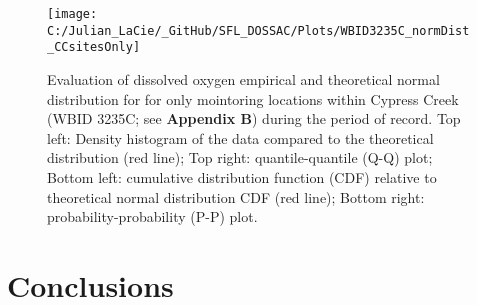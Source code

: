 \documentclass[]{interact}
\theoremstyle{plain}%
\theoremstyle{definition}
\theoremstyle{remark}
\begin{document}
\begin{figure}[H]

{\centering \texttt{[image: C:/Julian\_LaCie/\_GitHub/SFL\_DOSSAC/Plots/WBID3235C\_normDist\_CCsitesOnly]} 

}

\caption{\label{fig:fig13} Evaluation of dissolved oxygen empirical and theoretical normal distribution for for only mointoring locations within Cypress Creek (WBID 3235C; see \textbf{Appendix B}) during the period of record. Top left: Density histogram of the data compared to the theoretical distribution (red line); Top right: quantile-quantile (Q-Q) plot; Bottom left: cumulative distribution function (CDF) relative to theoretical normal distribution CDF (red line); Bottom right: probability-probability (P-P) plot.}\label{fig:unnamed-chunk-21}
\end{figure}

\hypertarget{conclusions}{%
\section{Conclusions}\label{conclusions}}
\end{document}
